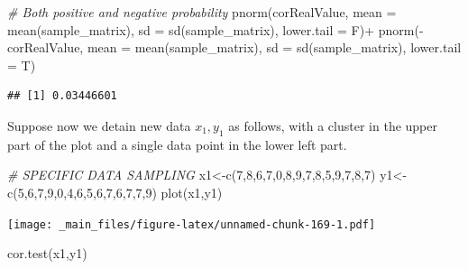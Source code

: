 \documentclass[
  notitlepage,
  onecolumn,
  openany]{book}
\newenvironment{Shaded}{\begin{snugshade}}{\end{snugshade}}
\newcommand{\AttributeTok}[1]{\textcolor[rgb]{0.77,0.63,0.00}{#1}}
\newcommand{\CommentTok}[1]{\textcolor[rgb]{0.56,0.35,0.01}{\textit{#1}}}
\newcommand{\DecValTok}[1]{\textcolor[rgb]{0.00,0.00,0.81}{#1}}
\newcommand{\FunctionTok}[1]{\textcolor[rgb]{0.00,0.00,0.00}{#1}}
\newcommand{\NormalTok}[1]{#1}
\newcommand{\OtherTok}[1]{\textcolor[rgb]{0.56,0.35,0.01}{#1}}
\newcommand{\SpecialCharTok}[1]{\textcolor[rgb]{0.00,0.00,0.00}{#1}}
\begin{document}
\begin{Shaded}
\begin{Highlighting}[]
\CommentTok{\# Both positive and negative probability}
\FunctionTok{pnorm}\NormalTok{(corRealValue, }\AttributeTok{mean =} \FunctionTok{mean}\NormalTok{(sample\_matrix), }\AttributeTok{sd =} \FunctionTok{sd}\NormalTok{(sample\_matrix), }\AttributeTok{lower.tail =}\NormalTok{ F)}\SpecialCharTok{+}
  \FunctionTok{pnorm}\NormalTok{(}\SpecialCharTok{{-}}\NormalTok{corRealValue, }\AttributeTok{mean =} \FunctionTok{mean}\NormalTok{(sample\_matrix), }\AttributeTok{sd =} \FunctionTok{sd}\NormalTok{(sample\_matrix), }\AttributeTok{lower.tail =}\NormalTok{ T)}
\end{Highlighting}
\end{Shaded}

\begin{verbatim}
## [1] 0.03446601
\end{verbatim}

Suppose now we detain new data \(x_1, y_1\) as follows, with a cluster in the upper part of the plot and a single data point in the lower left part.

\begin{Shaded}
\begin{Highlighting}[]
\CommentTok{\# SPECIFIC DATA SAMPLING}
\NormalTok{x1}\OtherTok{\textless{}{-}}\FunctionTok{c}\NormalTok{(}\DecValTok{7}\NormalTok{,}\DecValTok{8}\NormalTok{,}\DecValTok{6}\NormalTok{,}\DecValTok{7}\NormalTok{,}\DecValTok{0}\NormalTok{,}\DecValTok{8}\NormalTok{,}\DecValTok{9}\NormalTok{,}\DecValTok{7}\NormalTok{,}\DecValTok{8}\NormalTok{,}\DecValTok{5}\NormalTok{,}\DecValTok{9}\NormalTok{,}\DecValTok{7}\NormalTok{,}\DecValTok{8}\NormalTok{,}\DecValTok{7}\NormalTok{)}
\NormalTok{y1}\OtherTok{\textless{}{-}}\FunctionTok{c}\NormalTok{(}\DecValTok{5}\NormalTok{,}\DecValTok{6}\NormalTok{,}\DecValTok{7}\NormalTok{,}\DecValTok{9}\NormalTok{,}\DecValTok{0}\NormalTok{,}\DecValTok{4}\NormalTok{,}\DecValTok{6}\NormalTok{,}\DecValTok{5}\NormalTok{,}\DecValTok{6}\NormalTok{,}\DecValTok{7}\NormalTok{,}\DecValTok{6}\NormalTok{,}\DecValTok{7}\NormalTok{,}\DecValTok{7}\NormalTok{,}\DecValTok{9}\NormalTok{)}
\FunctionTok{plot}\NormalTok{(x1,y1)}
\end{Highlighting}
\end{Shaded}

\texttt{[image: \_main\_files/figure-latex/unnamed-chunk-169-1.pdf]}

\begin{Shaded}
\begin{Highlighting}[]
\FunctionTok{cor.test}\NormalTok{(x1,y1)}
\end{Highlighting}
\end{Shaded}
\end{document}
